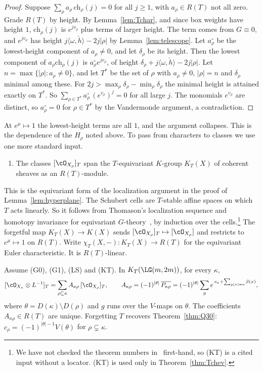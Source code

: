 \begin{proof}
Suppose $\sum_\rho a_\rho\,\mathrm{ch}_\rho(j)=0$ for all $j\ge1$, with $a_\rho\in R(T)$ not all zero. Grade
$R(T)$ by height. By Lemma~\ref{lem:Tchar}, and since box weights have height $1$,
$\mathrm{ch}_\rho(j)$ is $e^{jv_\rho}$ plus terms of larger height. The term comes from $G\equiv0$, and
$e^{jv_\rho}$ has height $j\langle\omega,\check h\rangle-2j|\rho|$ by Lemma~\ref{lem:telescope}. Let
$a_\rho^\circ$ be the lowest-height component of $a_\rho\ne0$, and let $\delta_\rho$ be its height. Then the
lowest component of $a_\rho\mathrm{ch}_\rho(j)$ is $a_\rho^\circ e^{jv_\rho}$, of height
$\delta_\rho+j\langle\omega,\check h\rangle-2j|\rho|$. Let $n=\max\{|\rho|:a_\rho\ne0\}$, and let
$T^*$ be the set of $\rho$ with $a_\rho\ne0$, $|\rho|=n$ and $\delta_\rho$ minimal among these. For
$2j>\max_\rho\delta_\rho-\min_\rho\delta_\rho$ the minimal height is attained exactly on $T^*$. So
$\sum_{\rho\in T^*}a^\circ_\rho\,(e^{v_\rho})^j=0$ for all large $j$. The monomials $e^{v_\rho}$ are
distinct, so $a^\circ_\rho=0$ for $\rho\in T^*$ by the Vandermonde argument, a contradiction.
\end{proof}

At $e^\mu\mapsto1$ the lowest-height terms are all $1$, and the argument collapses. This is the
dependence of the $H_\rho$ noted above. To pass from characters to classes we use one more standard input.

\begin{enumerate}[label=(KT),leftmargin=*]
\item The classes $[\cO_{X_\rho}]_T$ span the $T$-equivariant $K$-group $K_T(X)$ of coherent
sheaves as an $R(T)$-module.
\end{enumerate}
This is the equivariant form of the localization argument in the proof of
Lemma~\ref{lem:hyperplane}. The Schubert cells are $T$-stable affine spaces on which $T$ acts
linearly. So it follows from Thomason's localization sequence and homotopy invariance for
equivariant $G$-theory~\cite{Thomason87}, by induction over the cells.\footnote{We have not checked the theorem
numbers in~\cite{Thomason87} first-hand, so (KT) is a cited input without a locator. (KT) is used only in
Theorem~\ref{thm:Tchev}.} The forgetful map $K_T(X)\to K(X)$ sends $[\cO_{X_\rho}]_T\mapsto[\cO_{X_\rho}]$ and
restricts to $e^\mu\mapsto1$ on $R(T)$. Write $\chi_T(X,-)\colon K_T(X)\to R(T)$ for the equivariant Euler
characteristic. It is $R(T)$-linear.

\begin{theorem}\label{thm:Tchev}
Assume (G0), (G1), (LS) and (KT). In $K_T(\LG(m,2m))$, for every $\kappa$,
\[ [\cO_{X_\kappa}\otimes L^{-1}]_T=\sum_{\rho\subseteq\kappa}A_{\kappa\rho}\,[\cO_{X_\rho}]_T,\qquad
A_{\kappa\rho}=(-1)^{|\theta|}\,\overline{P_{\kappa\rho}}=(-1)^{|\theta|}\sum_ge^{\,v_\kappa+\sum_{g(x)=o}\beta(x)}, \]
where $\theta=D(\kappa)\setminus D(\rho)$ and $g$ runs over the $V$-maps on $\theta$. The coefficients
$A_{\kappa\rho}\in R(T)$ are unique. Forgetting $T$ recovers Theorem~\ref{thm:Q30}:
$c_\rho=(-1)^{|\theta|-1}V(\theta)$ for $\rho\subsetneq\kappa$.
\end{theorem}

